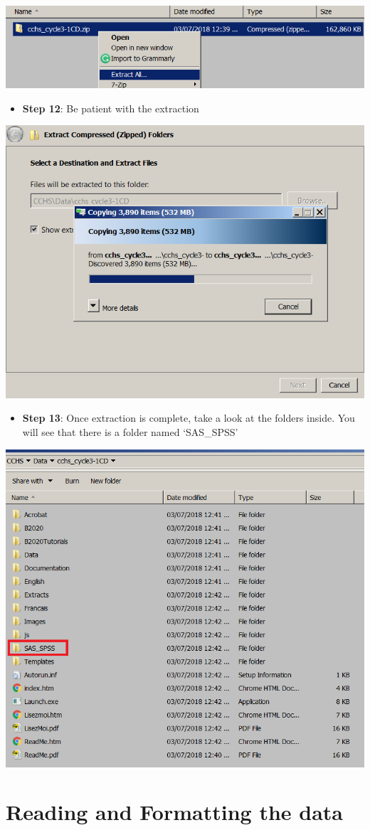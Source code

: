\documentclass[
]{book}
\providecommand{\tightlist}{%
  \setlength{\itemsep}{0pt}\setlength{\parskip}{0pt}}
\begin{document}
\includegraphics[width=0.65\linewidth]{images/abacus11}

\begin{itemize}
\tightlist
\item
  \textbf{Step 12}: Be patient with the extraction
\end{itemize}

\includegraphics[width=0.65\linewidth]{images/abacus12}

\begin{itemize}
\tightlist
\item
  \textbf{Step 13}: Once extraction is complete, take a look at the folders inside. You will see that there is a folder named `SAS\_SPSS'
\end{itemize}

\includegraphics[width=0.65\linewidth]{images/abacus13}

\hypertarget{reading-and-formatting-the-data}{%
\section{Reading and Formatting the data}\label{reading-and-formatting-the-data}}
\end{document}
